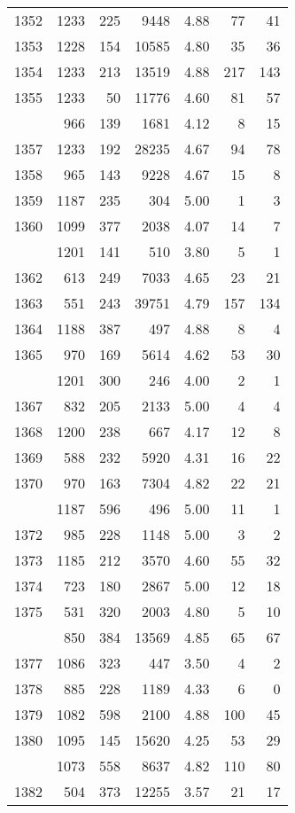 \documentclass[
]{article}
\begin{document}
\begin{table}
\begin{tabular}[t]{lrrrrrr}
1352 & 1233 & 225 & 9448 & 4.88 & 77 & 41\\
1353 & 1228 & 154 & 10585 & 4.80 & 35 & 36\\
1354 & 1233 & 213 & 13519 & 4.88 & 217 & 143\\
1355 & 1233 & 50 & 11776 & 4.60 & 81 & 57\\
\addlinespace
1356 & 966 & 139 & 1681 & 4.12 & 8 & 15\\
1357 & 1233 & 192 & 28235 & 4.67 & 94 & 78\\
1358 & 965 & 143 & 9228 & 4.67 & 15 & 8\\
1359 & 1187 & 235 & 304 & 5.00 & 1 & 3\\
1360 & 1099 & 377 & 2038 & 4.07 & 14 & 7\\
\addlinespace
1361 & 1201 & 141 & 510 & 3.80 & 5 & 1\\
1362 & 613 & 249 & 7033 & 4.65 & 23 & 21\\
1363 & 551 & 243 & 39751 & 4.79 & 157 & 134\\
1364 & 1188 & 387 & 497 & 4.88 & 8 & 4\\
1365 & 970 & 169 & 5614 & 4.62 & 53 & 30\\
\addlinespace
1366 & 1201 & 300 & 246 & 4.00 & 2 & 1\\
1367 & 832 & 205 & 2133 & 5.00 & 4 & 4\\
1368 & 1200 & 238 & 667 & 4.17 & 12 & 8\\
1369 & 588 & 232 & 5920 & 4.31 & 16 & 22\\
1370 & 970 & 163 & 7304 & 4.82 & 22 & 21\\
\addlinespace
1371 & 1187 & 596 & 496 & 5.00 & 11 & 1\\
1372 & 985 & 228 & 1148 & 5.00 & 3 & 2\\
1373 & 1185 & 212 & 3570 & 4.60 & 55 & 32\\
1374 & 723 & 180 & 2867 & 5.00 & 12 & 18\\
1375 & 531 & 320 & 2003 & 4.80 & 5 & 10\\
\addlinespace
1376 & 850 & 384 & 13569 & 4.85 & 65 & 67\\
1377 & 1086 & 323 & 447 & 3.50 & 4 & 2\\
1378 & 885 & 228 & 1189 & 4.33 & 6 & 0\\
1379 & 1082 & 598 & 2100 & 4.88 & 100 & 45\\
1380 & 1095 & 145 & 15620 & 4.25 & 53 & 29\\
\addlinespace
1381 & 1073 & 558 & 8637 & 4.82 & 110 & 80\\
1382 & 504 & 373 & 12255 & 3.57 & 21 & 17\\

\end{tabular}
\end{table}
\end{document}
